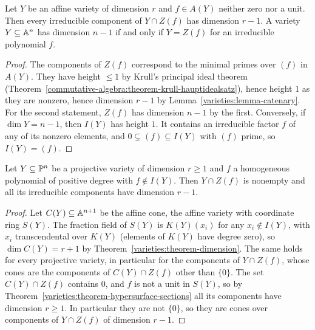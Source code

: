 \begin{theorem}\label{varieties:theorem-hypersurface-sections}
Let $Y$ be an affine variety of dimension $r$ and $f \in A(Y)$ neither zero nor a unit. Then every irreducible component of $Y \cap Z(f)$ has
dimension $r - 1$. A variety $Y \subseteq \mathbb{A}^n$ has dimension $n - 1$ if and only if $Y = Z(f)$ for an irreducible polynomial $f$.
\end{theorem}

\begin{proof}
The components of $Z(f)$ correspond to the minimal primes over $(f)$ in $A(Y)$. They have height $\leq 1$ by Krull's principal ideal theorem
(Theorem~\ref{commutative-algebra:theorem-krull-hauptidealsatz}), hence height $1$ as they are nonzero, hence dimension $r - 1$ by
Lemma~\ref{varieties:lemma-catenary}. For the second statement, $Z(f)$ has dimension $n - 1$ by the first. Conversely, if $\dim Y = n - 1$, then
$I(Y)$ has height $1$. It contains an irreducible factor $f$ of any of its nonzero elements, and $0 \subsetneq (f) \subseteq I(Y)$ with $(f)$ prime,
so $I(Y) = (f)$.
\end{proof}

\begin{theorem}\label{varieties:theorem-projective-dimension}
Let $Y \subseteq \mathbb{P}^n$ be a projective variety of dimension $r \geq 1$ and $f$ a homogeneous polynomial of positive degree with $f \notin I(Y)$.
Then $Y \cap Z(f)$ is nonempty and all its irreducible components have dimension $r - 1$.
\end{theorem}

\begin{proof}
Let $C(Y) \subseteq \mathbb{A}^{n+1}$ be the affine cone, the affine variety with coordinate ring $S(Y)$. The fraction field of $S(Y)$ is $K(Y)(x_i)$
for any $x_i \notin I(Y)$, with $x_i$ transcendental over $K(Y)$ (elements of $K(Y)$ have degree zero), so $\dim C(Y) = r + 1$ by
Theorem~\ref{varieties:theorem-dimension}. The same holds for every projective variety, in particular for the components of $Y \cap Z(f)$, whose
cones are the components of $C(Y) \cap Z(f)$ other than $\{0\}$. The set $C(Y) \cap Z(f)$ contains $0$, and $f$ is not a unit in $S(Y)$, so by
Theorem~\ref{varieties:theorem-hypersurface-sections} all its components have dimension $r \geq 1$. In particular they are not $\{0\}$, so they are
cones over components of $Y \cap Z(f)$ of dimension $r - 1$.
\end{proof}

